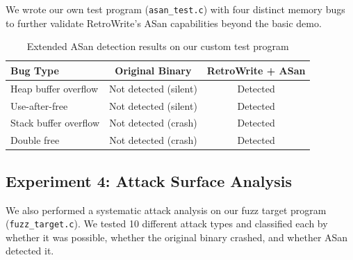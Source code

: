 \documentclass[10pt,a4paper]{article}
\begin{document}
We wrote our own test program (\texttt{asan\_test.c}) with four distinct memory bugs to further validate RetroWrite's ASan capabilities beyond the basic demo.

\begin{table}[H]
\centering
\caption{Extended ASan detection results on our custom test program}
\label{tab:asan_extended}
\begin{tabular}{lcc}
\toprule
\textbf{Bug Type} & \textbf{Original Binary} & \textbf{RetroWrite + ASan} \\
\midrule
\rowcolor{rowgray} Heap buffer overflow & \textcolor{danger}{Not detected (silent)} & \textcolor{success}{Detected} \\
Use-after-free & \textcolor{danger}{Not detected (silent)} & \textcolor{success}{Detected} \\
\rowcolor{rowgray} Stack buffer overflow & \textcolor{danger}{Not detected (crash)} & \textcolor{success}{Detected} \\
Double free & \textcolor{danger}{Not detected (crash)} & \textcolor{success}{Detected} \\
\bottomrule
\end{tabular}
\end{table}

\subsection{Experiment 4: Attack Surface Analysis}

We also performed a systematic attack analysis on our fuzz target program (\texttt{fuzz\_target.c}). We tested 10 different attack types and classified each by whether it was possible, whether the original binary crashed, and whether ASan detected it.
\end{document}
